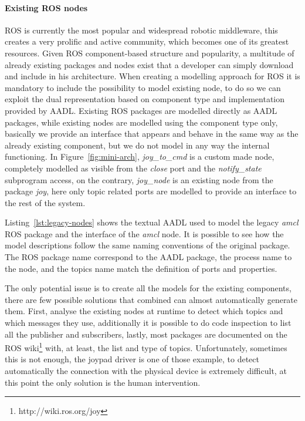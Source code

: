 \paragraph{Existing ROS nodes} ROS is currently the most popular and widespread robotic middleware, this creates a very prolific and active community, which becomes one of its greatest resources. Given ROS component-based structure and popularity,  a multitude of already existing packages and nodes exist that a developer can simply download and include in his architecture. When creating a modelling approach for ROS it is mandatory to include the possibility to model existing node, to do so we can exploit the dual representation based on component type and implementation provided by AADL.  Existing ROS packages are modelled directly as AADL packages, while existing nodes are modelled using the component type only, basically we provide an interface that appears and behave in the same way as the already existing component, but we do not model in any way the internal functioning. In Figure~\ref{fig:mini-arch}, \textit{joy\_to\_cmd} is a custom made node, completely modelled as visible from the \textit{close} port and the \textit{notify\_state} subprogram access, on the contrary, \textit{joy\_node} is an existing node from the package \textit{joy}, here only topic related ports are modelled to provide an interface to the rest of the system. 

Listing~\ref{lst:legacy-nodes} shows the textual AADL used to model the legacy \textit{amcl} ROS package and the interface of the \textit{amcl} node. It is possible to see how the model descriptions follow the same naming conventions of the original package. The ROS package name correspond to the AADL package, the process name to the node, and the topics name match the definition of ports and properties.

The only potential issue is to create all the models for the existing components, there are few possible solutions that combined can almost automatically generate them. First, analyse the existing nodes at runtime to detect which topics and which messages they use, additionally it is possible to do code inspection to list all the publisher and subscribers, lastly, most packages are documented on the ROS wiki\footnote{http://wiki.ros.org/joy} with, at least, the list and type of topics. Unfortunately, sometimes this is not enough, the joypad driver is one of those example, to detect automatically the connection with the physical device is extremely difficult, at this point the only solution is the human intervention.

